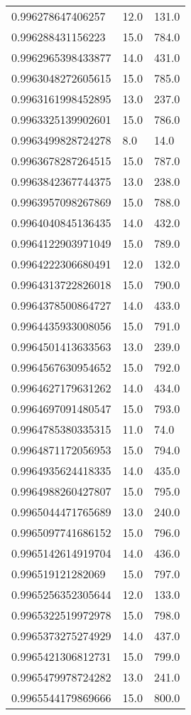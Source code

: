 \begin{center}
\begin{supertabular}[H]{p{0.30\textwidth}p{0.05\textwidth}p{0.05\textwidth}}
0.996278647406257 & 12.0 & 131.0 \\ 
0.996288431156223 & 15.0 & 784.0 \\ 
0.9962965398433877 & 14.0 & 431.0 \\ 
0.9963048272605615 & 15.0 & 785.0 \\ 
0.9963161998452895 & 13.0 & 237.0 \\ 
0.9963325139902601 & 15.0 & 786.0 \\ 
0.9963499828724278 & 8.0 & 14.0 \\ 
0.9963678287264515 & 15.0 & 787.0 \\ 
0.9963842367744375 & 13.0 & 238.0 \\ 
0.9963957098267869 & 15.0 & 788.0 \\ 
0.9964040845136435 & 14.0 & 432.0 \\ 
0.9964122903971049 & 15.0 & 789.0 \\ 
0.9964222306680491 & 12.0 & 132.0 \\ 
0.9964313722826018 & 15.0 & 790.0 \\ 
0.9964378500864727 & 14.0 & 433.0 \\ 
0.9964435933008056 & 15.0 & 791.0 \\ 
0.9964501413633563 & 13.0 & 239.0 \\ 
0.9964567630954652 & 15.0 & 792.0 \\ 
0.9964627179631262 & 14.0 & 434.0 \\ 
0.9964697091480547 & 15.0 & 793.0 \\ 
0.9964785380335315 & 11.0 & 74.0 \\ 
0.9964871172056953 & 15.0 & 794.0 \\ 
0.9964935624418335 & 14.0 & 435.0 \\ 
0.9964988260427807 & 15.0 & 795.0 \\ 
0.9965044471765689 & 13.0 & 240.0 \\ 
0.9965097741686152 & 15.0 & 796.0 \\ 
0.9965142614919704 & 14.0 & 436.0 \\ 
0.996519121282069 & 15.0 & 797.0 \\ 
0.9965256352305644 & 12.0 & 133.0 \\ 
0.9965322519972978 & 15.0 & 798.0 \\ 
0.9965373275274929 & 14.0 & 437.0 \\ 
0.9965421306812731 & 15.0 & 799.0 \\ 
0.9965479978724282 & 13.0 & 241.0 \\ 
0.9965544179869666 & 15.0 & 800.0 \\ 

\end{supertabular}
\end{center}
